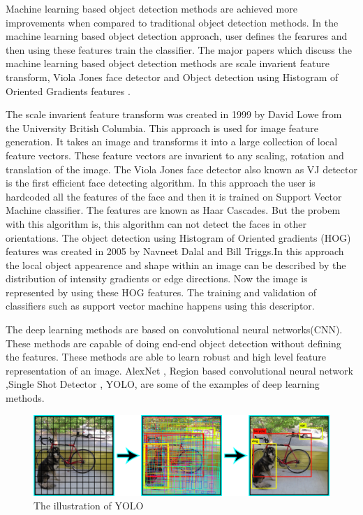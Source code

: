 \documentclass[conference]{IEEEtran}
\begin{document}
\par 
Machine learning based object detection methods are achieved more improvements when compared to traditional object detection methods. In the machine learning based object detection approach, user defines the fearures and then using these features train the classifier. The major papers which discuss the machine learning based object detection methods are scale invarient feature transform, Viola Jones face detector \cite{2} and  Object detection using Histogram of Oriented Gradients features \cite{4}. 
\par 
The scale invarient feature transform \cite{sift} was created in 1999 by David Lowe from the University British Columbia. This approach is used for image feature generation. It takes an image and transforms it into a large collection of local feature vectors. These feature vectors are invarient to any scaling, rotation and translation of the image. The Viola Jones face detector also known as VJ detector \cite{2} is the first efficient face detecting algorithm. In this approach the user is hardcoded all the features of the face and then it is trained on Support Vector Machine classifier. The features are known as Haar Cascades. But the probem with this algorithm is, this algorithm can not  detect the faces in other orientations. The object detection using Histogram of Oriented gradients (HOG) \cite{4} features was created in 2005 by Navneet Dalal and Bill Triggs.In this approach the local object appearence and shape within an image can be described by the distribution of intensity gradients or edge directions. Now the image is represented by using these HOG features. The training and validation of classifiers such as support vector machine happens using this descriptor.  
\par
The deep learning methods are based on convolutional neural networks(CNN). These methods are capable of doing end-end object detection without defining the features. These methods are able to learn robust and high level feature representation of an image. AlexNet \cite{alexnet}, Region based convolutional neural network \cite{8},Single Shot Detector \cite{ssd}, YOLO, are some of the examples of deep  learning methods. 
\par 
\begin{figure}[!h]
	\includegraphics[width=\columnwidth]{./images/yolo.png}
	\caption{The illustration of YOLO}
	\label{yolo}
\end{figure} 
\end{document}
